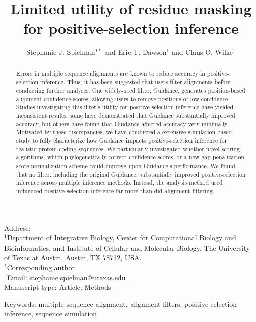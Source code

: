 \documentclass[11pt]{article}
\begin{document}
\title{\textbf{Limited utility of residue masking for positive-selection inference}}
\author{Stephanie J. Spielman$^{1*}$ and Eric T. Dawson$^{1}$ and Claus O. Wilke$^{1}$}
\date{}

\maketitle
\noindent
Address:\\
$^1$Department of Integrative Biology, Center for Computational Biology and Bioinformatics, and Institute of Cellular and Molecular Biology.
The University of Texas at Austin, Austin, TX 78712, USA.\\

\bigskip
\noindent
$^*$Corresponding author\\
$\phantom{^*}$Email: stephanie.spielman@utexas.edu\\

\bigskip
\noindent
Manuscript type: Article; Methods

\bigskip
\noindent Keywords: multiple sequence alignment, alignment filters, positive-selection inference, sequence simulation

\newpage
\begin{abstract}
Errors in multiple sequence alignments are known to reduce accuracy in positive-selection inference. Thus, it has been suggested that users filter alignments before conducting further analyses. One widely-used filter, Guidance, generates position-based alignment confidence scores, allowing users to remove positions of low confidence. Studies investigating this filter's utility for positive-selection inference have yielded inconsistent results; some have demonstrated that Guidance substantially improved accuracy, but others have found that Guidance affected accuracy very minimally. Motivated by these discrepancies, we have conducted a extensive simulation-based study to fully characterize how Guidance impacts positive-selection inference for realistic protein-coding sequences. We particularly investigated whether novel scoring algorithms, which phylogenetically correct confidence scores, or a new gap-penalization score-normalization scheme could improve upon Guidance's performance. We found that no filter, including the original Guidance, substantially improved positive-selection inference across multiple inference methods. Instead, the analysis method used influenced positive-selection inference far more than did alignment filtering.
\end{abstract}
\end{document}
